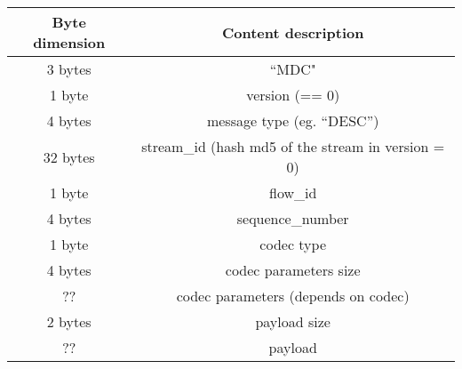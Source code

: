 \begin{center} \begin{tabular}{|c|c|}
\hline
Byte dimension & Content description\\
\hline \hline
3 bytes & ``MDC"\\
1 byte & version (== 0)\\
4 bytes & message type (eg. ``DESC'')\\
32 bytes & stream\_id (hash md5 of the stream in version = 0)\\
1 byte & flow\_id\\
4 bytes & sequence\_number\\
1 byte & codec type\\
4 bytes & codec parameters size\\
?? & codec parameters (depends on codec)\\
2 bytes & payload size\\
?? & payload\\
\hline
\end{tabular} \end{center}